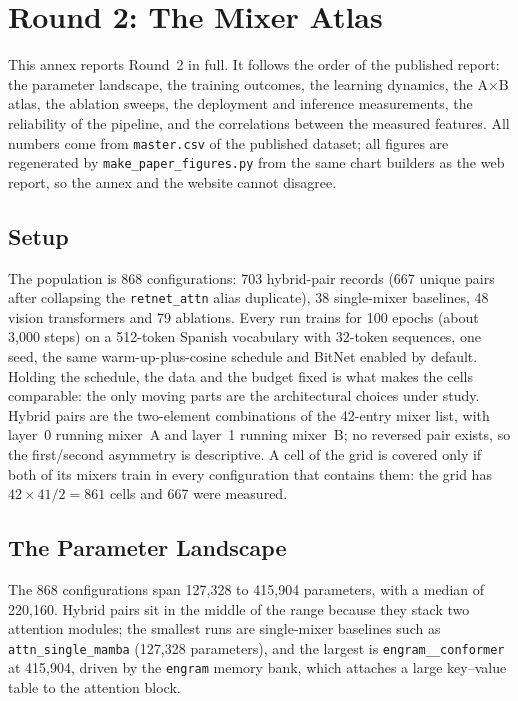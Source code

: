 \section{Round 2: The Mixer Atlas}
\label{sec:annex-experiment-2}

This annex reports Round~2 in full. It follows the order of the published report: the parameter landscape, the training outcomes, the learning dynamics, the A$\times$B atlas, the ablation sweeps, the deployment and inference measurements, the reliability of the pipeline, and the correlations between the measured features. All numbers come from \texttt{master.csv} of the published dataset; all figures are regenerated by \texttt{make\_paper\_figures.py} from the same chart builders as the web report, so the annex and the website cannot disagree.

\subsection{Setup}

The population is 868 configurations: 703 hybrid-pair records (667 unique pairs after collapsing the \texttt{retnet\_attn} alias duplicate), 38 single-mixer baselines, 48 vision transformers and 79 ablations. Every run trains for 100 epochs (about 3{,}000 steps) on a 512-token Spanish vocabulary with 32-token sequences, one seed, the same warm-up-plus-cosine schedule and BitNet enabled by default. Holding the schedule, the data and the budget fixed is what makes the cells comparable: the only moving parts are the architectural choices under study. Hybrid pairs are the two-element combinations of the 42-entry mixer list, with layer~0 running mixer~A and layer~1 running mixer~B; no reversed pair exists, so the first/second asymmetry is descriptive. A cell of the grid is covered only if both of its mixers train in every configuration that contains them: the grid has $42\times41/2 = 861$ cells and 667 were measured.

\subsection{The Parameter Landscape}

The 868 configurations span 127{,}328 to 415{,}904 parameters, with a median of 220{,}160. Hybrid pairs sit in the middle of the range because they stack two attention modules; the smallest runs are single-mixer baselines such as \texttt{attn\_single\_mamba} (127{,}328 parameters), and the largest is \texttt{engram\_\_conformer} at 415{,}904, driven by the \texttt{engram} memory bank, which attaches a large key--value table to the attention block.

